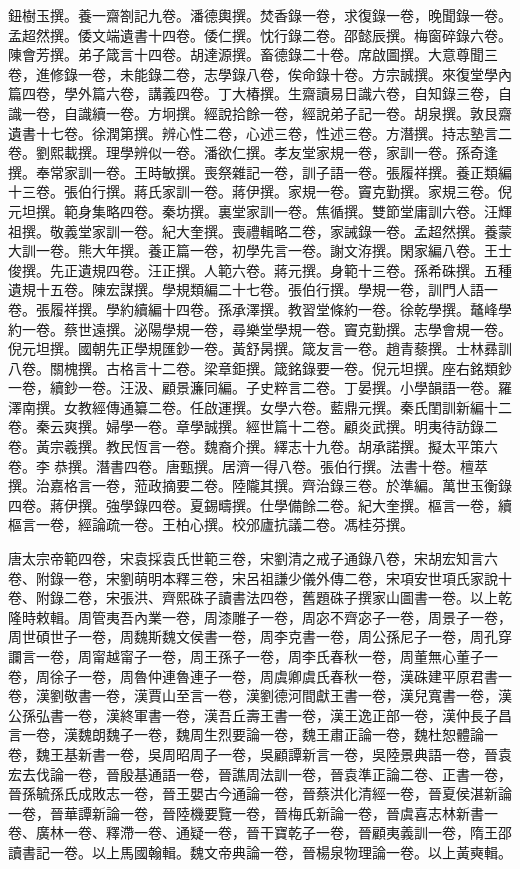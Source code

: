 \begin{pinyinscope}
鈕樹玉撰。養一齋劄記九卷。潘德輿撰。焚香錄一卷，求復錄一卷，晚聞錄一卷。孟超然撰。倭文端遺書十四卷。倭仁撰。忱行錄二卷。邵懿辰撰。梅窗碎錄六卷。陳會芳撰。弟子箴言十四卷。胡達源撰。畜德錄二十卷。席啟圖撰。大意尊聞三卷，進修錄一卷，未能錄二卷，志學錄八卷，俟命錄十卷。方宗誠撰。來復堂學內篇四卷，學外篇六卷，講義四卷。丁大椿撰。生齋讀易日識六卷，自知錄三卷，自識一卷，自識續一卷。方坰撰。經說拾餘一卷，經說弟子記一卷。胡泉撰。敦艮齋遺書十七卷。徐潤第撰。辨心性二卷，心述三卷，性述三卷。方潛撰。持志塾言二卷。劉熙載撰。理學辨似一卷。潘欲仁撰。孝友堂家規一卷，家訓一卷。孫奇逢撰。奉常家訓一卷。王時敏撰。喪祭雜記一卷，訓子語一卷。張履祥撰。養正類編十三卷。張伯行撰。蔣氏家訓一卷。蔣伊撰。家規一卷。竇克勤撰。家規三卷。倪元坦撰。範身集略四卷。秦坊撰。裏堂家訓一卷。焦循撰。雙節堂庸訓六卷。汪輝祖撰。敬義堂家訓一卷。紀大奎撰。喪禮輯略二卷，家誡錄一卷。孟超然撰。養蒙大訓一卷。熊大年撰。養正篇一卷，初學先言一卷。謝文洊撰。閑家編八卷。王士俊撰。先正遺規四卷。汪正撰。人範六卷。蔣元撰。身範十三卷。孫希硃撰。五種遺規十五卷。陳宏謀撰。學規類編二十七卷。張伯行撰。學規一卷，訓門人語一卷。張履祥撰。學約續編十四卷。孫承澤撰。教習堂條約一卷。徐乾學撰。鼇峰學約一卷。蔡世遠撰。泌陽學規一卷，尋樂堂學規一卷。竇克勤撰。志學會規一卷。倪元坦撰。國朝先正學規匯鈔一卷。黃舒昺撰。箴友言一卷。趙青藜撰。士林彞訓八卷。關槐撰。古格言十二卷。梁章鉅撰。箴銘錄要一卷。倪元坦撰。座右銘類鈔一卷，續鈔一卷。汪汲、顧景濂同編。子史粹言二卷。丁晏撰。小學韻語一卷。羅澤南撰。女教經傳通纂二卷。任啟運撰。女學六卷。藍鼎元撰。秦氏閨訓新編十二卷。秦云爽撰。婦學一卷。章學誠撰。經世篇十二卷。顧炎武撰。明夷待訪錄二卷。黃宗羲撰。教民恆言一卷。魏裔介撰。繹志十九卷。胡承諾撰。擬太平策六卷。李恭撰。潛書四卷。唐甄撰。居濟一得八卷。張伯行撰。法書十卷。檀萃撰。治嘉格言一卷，蒞政摘要二卷。陸隴其撰。齊治錄三卷。於準編。萬世玉衡錄四卷。蔣伊撰。強學錄四卷。夏錫疇撰。仕學備餘二卷。紀大奎撰。樞言一卷，續樞言一卷，經論疏一卷。王柏心撰。校邠廬抗議二卷。馮桂芬撰。

唐太宗帝範四卷，宋袁採袁氏世範三卷，宋劉清之戒子通錄八卷，宋胡宏知言六卷、附錄一卷，宋劉萌明本釋三卷，宋呂祖謙少儀外傳二卷，宋項安世項氏家說十卷、附錄二卷，宋張洪、齊熙硃子讀書法四卷，舊題硃子撰家山圖書一卷。以上乾隆時敕輯。周管夷吾內業一卷，周漆雕子一卷，周宓不齊宓子一卷，周景子一卷，周世碩世子一卷，周魏斯魏文侯書一卷，周李克書一卷，周公孫尼子一卷，周孔穿讕言一卷，周甯越甯子一卷，周王孫子一卷，周李氏春秋一卷，周董無心董子一卷，周徐子一卷，周魯仲連魯連子一卷，周虞卿虞氏春秋一卷，漢硃建平原君書一卷，漢劉敬書一卷，漢賈山至言一卷，漢劉德河間獻王書一卷，漢兒寬書一卷，漢公孫弘書一卷，漢終軍書一卷，漢吾丘壽王書一卷，漢王逸正部一卷，漢仲長子昌言一卷，漢魏朗魏子一卷，魏周生烈要論一卷，魏王肅正論一卷，魏杜恕體論一卷，魏王基新書一卷，吳周昭周子一卷，吳顧譚新言一卷，吳陸景典語一卷，晉袁宏去伐論一卷，晉殷基通語一卷，晉譙周法訓一卷，晉袁準正論二卷、正書一卷，晉孫毓孫氏成敗志一卷，晉王嬰古今通論一卷，晉蔡洪化清經一卷，晉夏侯湛新論一卷，晉華譚新論一卷，晉陸機要覽一卷，晉梅氏新論一卷，晉虞喜志林新書一卷、廣林一卷、釋滯一卷、通疑一卷，晉干寶乾子一卷，晉顧夷義訓一卷，隋王邵讀書記一卷。以上馬國翰輯。魏文帝典論一卷，晉楊泉物理論一卷。以上黃奭輯。


\end{pinyinscope}
